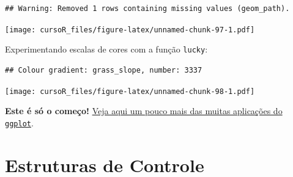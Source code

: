 \documentclass[]{book}
\newenvironment{Shaded}{\begin{snugshade}}{\end{snugshade}}
\newcommand{\KeywordTok}[1]{\textcolor[rgb]{0.13,0.29,0.53}{\textbf{#1}}}
\newcommand{\DataTypeTok}[1]{\textcolor[rgb]{0.13,0.29,0.53}{#1}}
\newcommand{\DecValTok}[1]{\textcolor[rgb]{0.00,0.00,0.81}{#1}}
\newcommand{\StringTok}[1]{\textcolor[rgb]{0.31,0.60,0.02}{#1}}
\newcommand{\CommentTok}[1]{\textcolor[rgb]{0.56,0.35,0.01}{\textit{#1}}}
\newcommand{\OperatorTok}[1]{\textcolor[rgb]{0.81,0.36,0.00}{\textbf{#1}}}
\newcommand{\NormalTok}[1]{#1}
\theoremstyle{definition}
\theoremstyle{definition}
\theoremstyle{definition}
\theoremstyle{remark}
\begin{document}
\begin{verbatim}
## Warning: Removed 1 rows containing missing values (geom_path).
\end{verbatim}

\texttt{[image: cursoR\_files/figure-latex/unnamed-chunk-97-1.pdf]}

Experimentando escalas de cores com a função \texttt{lucky}:

\begin{Shaded}
\end{Shaded}

\begin{verbatim}
## Colour gradient: grass_slope, number: 3337
\end{verbatim}

\texttt{[image: cursoR\_files/figure-latex/unnamed-chunk-98-1.pdf]}

\textbf{Este é só o começo!}
\href{http://r-statistics.co/Top50-Ggplot2-Visualizations-MasterList-R-Code.html}{Veja
aqui um pouco mais das muitas aplicações do \texttt{ggplot}}.

\chapter{Estruturas de Controle}\label{loop}
\end{document}
